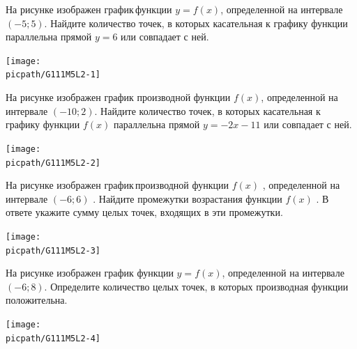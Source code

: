 \begin{consultation}
\begin{listofex}
		\item
		\begin{minipage}[t]{0.45\linewidth}
			На рисунке изображен график функции \( y = f(x)\), определенной на интервале \((-5; 5)\). Найдите количество точек, в которых касательная к графику функции параллельна прямой \(y  =  6\) или совпадает с ней.
		\end{minipage}
		\hspace{0.02\linewidth}
		\begin{minipage}[t]{0.5\linewidth}
			\texttt{[image: \\picpath/G111M5L2-1]}
		\end{minipage}
		\item
		\begin{minipage}[t]{0.45\linewidth}
			На рисунке изображен график производной функции \(f(x)\), определенной на интервале \((-10; 2)\). Найдите количество точек, в которых касательная к графику функции \(f(x)\) параллельна прямой \(y = -2x - 11\) или совпадает с ней.
		\end{minipage}
		\hspace{0.02\linewidth}
		\begin{minipage}[t]{0.5\linewidth}
			\texttt{[image: \\picpath/G111M5L2-2]}
		\end{minipage}
		\item
		\begin{minipage}[t]{0.47\linewidth}
			На рисунке изображен график производной функции \(f(x)\) , определенной на интервале \( (-6;6) \) . Найдите промежутки возрастания функции \(f(x)\) . В ответе укажите сумму целых точек, входящих в эти промежутки.
		\end{minipage}
		\hspace{0.02\linewidth}
		\begin{minipage}[t]{0.47\linewidth}
			\texttt{[image: \\picpath/G111M5L2-3]}
		\end{minipage}
		\item
		\begin{minipage}[t]{0.47\linewidth}
			На рисунке изображен график функции \(y = f(x)\), определенной на интервале \((-6; 8)\). Определите количество целых точек, в которых производная функции положительна.
		\end{minipage}
		\hspace{0.02\linewidth}
		\begin{minipage}[t]{0.47\linewidth}
			\texttt{[image: \\picpath/G111M5L2-4]}
		\end{minipage}
		

\end{listofex}
\end{consultation}
